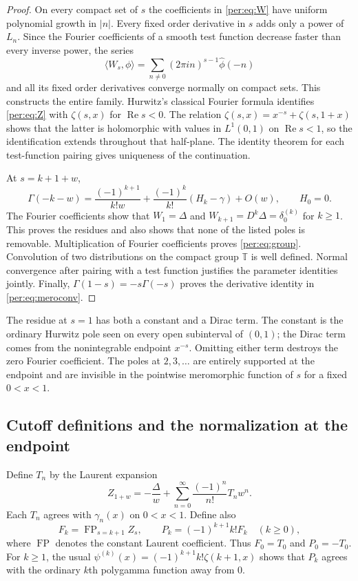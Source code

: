 \begin{proof}
On every compact set of $s$ the coefficients in \eqref{per:eq:W} have
uniform polynomial growth in $|n|$. Every fixed order derivative in $s$
adds only a power of $L_n$. Since the Fourier coefficients of a smooth
test function decrease faster than every inverse power, the series
\[
 \langle W_s,\phi\rangle
 =\sum_{n\ne0}(2\pi i n)^{s-1}\widehat\phi(-n)
\]
and all its fixed order derivatives converge normally on compact sets.
This constructs the entire family. Hurwitz's classical Fourier formula
\cite[\S25.11]{DLMFHurwitz} identifies \eqref{per:eq:Z} with $\zeta(s,x)$
for $\operatorname{Re}s<0$. The relation
$\zeta(s,x)=x^{-s}+\zeta(s,1+x)$ shows that the latter is holomorphic
with values in $L^1(0,1)$ on $\operatorname{Re}s<1$, so the
identification extends throughout that half-plane. The identity theorem
for each test-function pairing gives uniqueness of the continuation.

At $s=k+1+w$,
\begin{equation}\label{per:eq:gammapole}
 \Gamma(-k-w)=\frac{(-1)^{k+1}}{k!w}
       +\frac{(-1)^k}{k!}(H_k-\gamma)+O(w),
 \qquad H_0=0.
\end{equation}
The Fourier coefficients show that $W_1=\Delta$ and
$W_{k+1}=D^k\Delta=\delta_0^{(k)}$ for $k\ge1$.
This proves the residues and also shows that none of the listed poles
is removable. Multiplication of Fourier coefficients proves
\eqref{per:eq:group}. Convolution of two distributions on the compact
group $\mathbb T$ is well defined. Normal convergence after pairing with
a test function justifies the parameter identities jointly. Finally,
$\Gamma(1-s)=-s\Gamma(-s)$ proves the derivative identity in
\eqref{per:eq:meroconv}.
\end{proof}

The residue at $s=1$ has both a constant and a Dirac term. The constant
is the ordinary Hurwitz pole seen on every open subinterval of $(0,1)$;
the Dirac term comes from the nonintegrable endpoint $x^{-s}$. Omitting
either term destroys the zero Fourier coefficient. The poles at
$2,3,\ldots$ are entirely supported at the endpoint and are invisible
in the pointwise meromorphic function of $s$ for a fixed $0<x<1$.

\subsection{Cutoff definitions and the normalization at the endpoint}

Define $T_n$ by the Laurent expansion
\begin{equation}\label{per:eq:Tdef}
 Z_{1+w}=-\frac{\Delta}{w}
       +\sum_{n=0}^{\infty}\frac{(-1)^n}{n!}T_nw^n.
\end{equation}
Each $T_n$ agrees with $\gamma_n(x)$ on $0<x<1$. Define also
\begin{equation}\label{per:eq:Pdef}
 F_k=\operatorname{FP}_{s=k+1}Z_s,\qquad
 P_k=(-1)^{k+1}k!F_k\quad(k\ge0),
\end{equation}
where $\operatorname{FP}$ denotes the constant Laurent coefficient.
Thus $F_0=T_0$ and $P_0=-T_0$. For $k\ge1$, the usual
$\psi^{(k)}(x)=(-1)^{k+1}k!\zeta(k+1,x)$ shows that $P_k$ agrees with
the ordinary $k$th polygamma function away from $0$.

